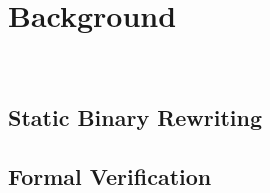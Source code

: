 \section{Background}~\label{sec:back}

\subsection{\cfi}

\subsection{Static Binary Rewriting}

\subsection{Formal Verification}